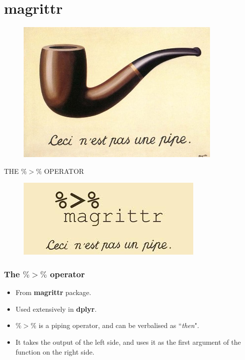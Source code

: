 \documentclass{beamer}
\begin{document}
\section{magrittr}
\begin{frame}
	\begin{figure}
		\centering
		\includegraphics[width=0.99\linewidth]{images/pipe}
		
	\end{figure}
	\begin{center}
		{\huge THE $ \%>\% $ OPERATOR}
	\end{center}
\end{frame}
\begin{frame}
	\begin{figure}
		\centering
		\includegraphics[width=0.99\linewidth]{images/pipe2}
		
	\end{figure}
\end{frame}
\begin{frame}[fragile]
	\frametitle{ The $\%>\%$ operator}
	\LARGE
	\begin{itemize}
		\item From \textbf{magrittr} package. 
		\item Used extensively in \textbf{dplyr}.
		\item $\%>\%$ is a piping operator, and can be verbalised as ``\textit{then}".
		\item It takes the output of the left side, and uses it as the first
		argument of the function on the right side.
	\end{itemize}
\end{frame}
\end{document}
